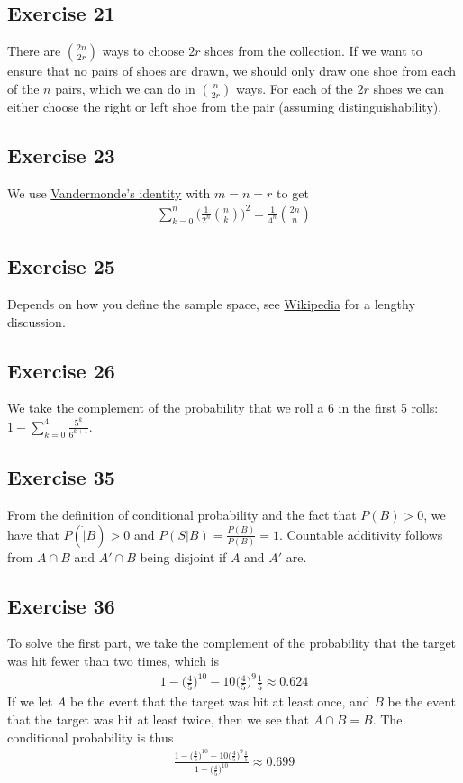 \subsection{Exercise 21}
There are $\binom{2n}{2r}$ ways to choose $2r$ shoes from the collection. If we want to ensure that
no pairs of shoes are drawn, we should only draw one shoe from each of the $n$ pairs, which we can do
in $\binom{n}{2r}$ ways. For each of the $2r$ shoes we can either choose the right or left shoe from 
the pair (assuming distinguishability).

\subsection{Exercise 23}
We use \href{https://en.wikipedia.org/wiki/Vandermonde%27s_identity}{Vandermonde's identity} with $m = n = r$ to get
\begin{align*}
        \sum_{k = 0}^n \bigg(\frac{1}{2^n} \binom{n}{k} \bigg)^2 = \frac{1}{4^n} \binom{2n}{n}
\end{align*}

\subsection{Exercise 25}
Depends on how you define the sample space, see \href{https://en.wikipedia.org/wiki/Boy_or_Girl_paradox#Analysis_of_the_ambiguity}{Wikipedia} for a lengthy discussion.

\subsection{Exercise 26}
We take the complement of the probability that we roll a 6 in the first 5 rolls:
$1 - \sum_{k = 0}^{4} \frac{5^k}{6^{k+1}}$.

\subsection{Exercise 35}
From the definition of conditional probability and the fact that $P(B) > 0$,
we have that $P(\dot | B) > 0$ and $P(S | B) = \frac{P(B)}{P(B)} = 1$. Countable additivity
follows from $A \cap B$ and $A' \cap B$ being disjoint if $A$ and $A'$ are.

\subsection{Exercise 36}
To solve the first part, we take the complement of the probability that the target was hit fewer than
two times, which is
\begin{align*}
        1 - \bigg(\frac{4}{5}\bigg)^{10} - 10\bigg(\frac{4}{5}\bigg)^9 \frac{1}{5} \approx 0.624
\end{align*}
If we let $A$ be the event that the target was hit at least once, and $B$ be the event that the target was
hit at least twice, then we see that $A \cap B = B$. The conditional probability is thus
\begin{align*}
        \frac{1 - \bigg(\frac{4}{5}\bigg)^{10} - 10\bigg(\frac{4}{5}\bigg)^9 \frac{1}{5}}{1 - \bigg(\frac{4}{5}\bigg)^{10}} \approx 0.699
\end{align*}
